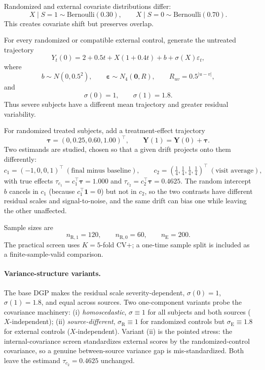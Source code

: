 \documentclass[11pt]{article}
\newcommand{\R}{\mathrm{R}}
\newcommand{\E}{\mathrm{E}}
\begin{document}
Randomized and external covariate distributions differ:
\[
X\mid S=1\sim\mathrm{Bernoulli}(0.30),
\qquad
X\mid S=0\sim\mathrm{Bernoulli}(0.70).
\tag{17}
\]
This creates covariate shift but preserves overlap.

For every randomized or compatible external control, generate the untreated trajectory
\[
Y_t(0)
=
2+0.5t+X(1+0.4t)+b+\sigma(X)\varepsilon_t,
\tag{18}
\]
where
\[
b\sim N(0,0.5^2),
\qquad
\bm\varepsilon\sim N_4(\bm 0,R),
\qquad
R_{uv}=0.5^{|u-v|},
\]
and
\[
\sigma(0)=1,
\qquad
\sigma(1)=1.8.
\tag{19}
\]
Thus severe subjects have a different mean trajectory and greater residual variability.

For randomized treated subjects, add a treatment-effect trajectory
\[
\bm\tau=(0,0.25,0.60,1.00)^{\top},
\qquad
\bm Y(1)=\bm Y(0)+\bm\tau.
\tag{20}
\]
Two estimands are studied, chosen so that a given drift projects onto them differently:
\[
c_1=(-1,0,0,1)^{\top}\ (\text{final minus baseline}),
\qquad
c_2=(\tfrac14,\tfrac14,\tfrac14,\tfrac14)^{\top}\ (\text{visit average}),
\tag{21}
\]
with true effects $\tau_{c_1}=c_1^{\top}\bm\tau=1.000$ and $\tau_{c_2}=c_2^{\top}\bm\tau=0.4625$. The random intercept $b$ cancels in $c_1$ (because $c_1^{\top}\bm 1=0$) but not in $c_2$, so the two contrasts have different residual scales and signal-to-noise, and the same drift can bias one while leaving the other unaffected.

Sample sizes are
\[
n_{\R,1}=120,
\qquad
n_{\R,0}=60,
\qquad
n_{\E}=200.
\tag{22}
\]
The practical screen uses $K=5$-fold CV+; a one-time sample split is included as a finite-sample-valid comparison.

\paragraph{Variance-structure variants.}
The base DGP makes the residual scale severity-dependent, $\sigma(0){=}1$, $\sigma(1){=}1.8$, and equal across sources. Two one-component variants probe the covariance machinery: (i) \emph{homoscedastic}, $\sigma{\equiv}1$ for all subjects and both sources ($X$-independent); (ii) \emph{source-different}, $\sigma_{\R}{\equiv}1$ for randomized controls but $\sigma_{\E}{\equiv}1.8$ for external controls ($X$-independent). Variant (ii) is the pointed stress: the internal-covariance screen standardizes external scores by the randomized-control covariance, so a genuine between-source variance gap is mis-standardized. Both leave the estimand $\tau_{c_2}{=}0.4625$ unchanged.
\end{document}
